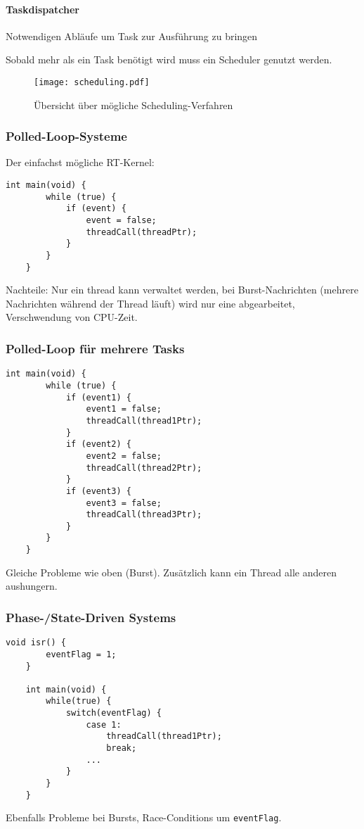 \paragraph{Taskdispatcher} Notwendigen Abläufe um Task zur Ausführung zu bringen

Sobald mehr als ein Task benötigt wird muss ein Scheduler genutzt werden.
\begin{figure}[H]
    \centering
    \texttt{[image: scheduling.pdf]}
    \caption{Übersicht über mögliche Scheduling-Verfahren}
\end{figure}

\subsubsection{Polled-Loop-Systeme}
Der einfachst mögliche RT-Kernel:
\begin{lstlisting}[style=c]
    int main(void) {
        while (true) {
            if (event) {
                event = false;
                threadCall(threadPtr);
            }
        }
    }
\end{lstlisting}
Nachteile: Nur ein thread kann verwaltet werden, bei Burst-Nachrichten (mehrere Nachrichten während der Thread läuft) wird nur eine abgearbeitet, Verschwendung von CPU-Zeit.

\subsubsection{Polled-Loop für mehrere Tasks}
\begin{lstlisting}[style=c]
    int main(void) {
        while (true) {
            if (event1) {
                event1 = false;
                threadCall(thread1Ptr);
            }
            if (event2) {
                event2 = false;
                threadCall(thread2Ptr);
            }
            if (event3) {
                event3 = false;
                threadCall(thread3Ptr);
            }
        }
    }
\end{lstlisting}
Gleiche Probleme wie oben (Burst). Zusätzlich kann ein Thread alle anderen aushungern.

\subsubsection{Phase-/State-Driven Systems}
\begin{lstlisting}[style=c]
    void isr() {
        eventFlag = 1;
    }

    int main(void) {
        while(true) {
            switch(eventFlag) {
                case 1:
                    threadCall(thread1Ptr);
                    break;
                ...
            }
        }
    }
\end{lstlisting}
Ebenfalls Probleme bei Bursts, Race-Conditions um \lstinline[style=c]{eventFlag}.
